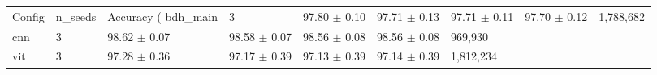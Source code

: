 \begin{tabular}{lllllll}
\hline
Config & n_seeds & Accuracy (%
bdh\_main & 3 & 97.80 $\pm$ 0.10 & 97.71 $\pm$ 0.13 & 97.71 $\pm$ 0.11 & 97.70 $\pm$ 0.12 & 1,788,682 \\
cnn & 3 & 98.62 $\pm$ 0.07 & 98.58 $\pm$ 0.07 & 98.56 $\pm$ 0.08 & 98.56 $\pm$ 0.08 & 969,930 \\
vit & 3 & 97.28 $\pm$ 0.36 & 97.17 $\pm$ 0.39 & 97.13 $\pm$ 0.39 & 97.14 $\pm$ 0.39 & 1,812,234 \\
\hline
\end{tabular}